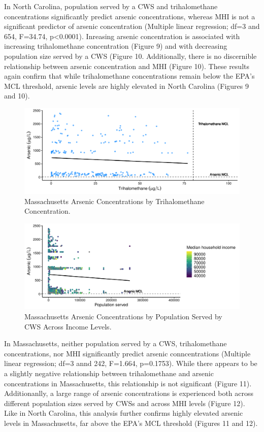 \documentclass[12pt,]{article}
\begin{document}
In North Carolina, population served by a CWS and trihalomethane
concentrations significantly predict arsenic concentrations, whereas MHI
is not a significant predictor of arsenic concentration (Multiple linear
regression; df=3 and 654, F=34.74, p\textless{}0.0001). Inreasing
arsenic concentration is associated with increasing trihalomethane
concentration (Figure 9) and with decreasing population size served by a
CWS (Figure 10. Additionally, there is no discernible relationship
between arsenic concentration and MHI (Figure 10). These results again
confirm that while trihalomethane concentrations remain below the EPA's
MCL threshold, arsenic levels are highly elevated in North Carolina
(Figures 9 and 10).

\newpage

\begin{figure}
\centering
\includegraphics{Project_Template_files/figure-latex/figs11-1.pdf}
\caption{Massachusetts Arsenic Concentrations by Trihalomethane
Concentration.}
\end{figure}

\begin{figure}
\centering
\includegraphics{Project_Template_files/figure-latex/figs12-1.pdf}
\caption{Massachusetts Arsenic Concentrations by Population Served by
CWS Across Income Levels.}
\end{figure}

In Massachusetts, neither population served by a CWS, trihalomethane
concentrations, nor MHI significantly predict arsenic conncentrations
(Multiple linear regression; df=3 annd 242, F=1.664, p=0.1753). While
there appears to be a slightly negative relationship between
trihalomethane and arsenic concentrations in Massachusetts, this
relationship is not significant (Figure 11). Additionanlly, a large
range of arsenic concentrations is experienced both across different
population sizes served by CWSs and across MHI levels (Figure 12). Like
in North Carolina, this analysis further confirms highly elevated
arsenic levels in Massachusetts, far above the EPA's MCL threshold
(Figures 11 and 12).
\end{document}
